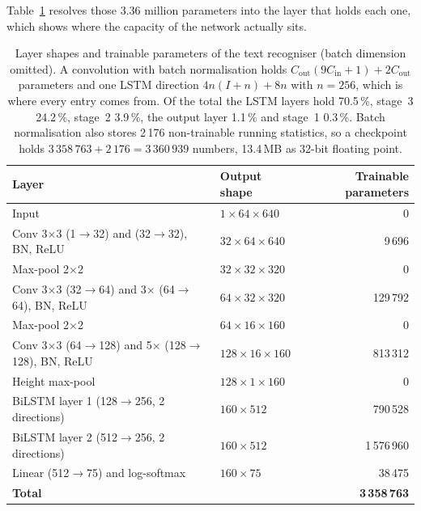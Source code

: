 Table~\ref{tab:rec-layers} resolves those 3.36 million parameters into the layer that holds each one, which shows where the capacity of the network actually sits.

\begin{table}[h]
\centering
\fontsize{8.5}{10.2}\selectfont
\setlength{\tabcolsep}{4pt}
\begin{tabular}{|l|l|r|}
\hline
\textbf{Layer} & \textbf{Output shape} & \textbf{Trainable parameters} \\
\hline
Input & $1\times64\times640$ & 0 \\
Conv 3$\times$3 (1$\to$32) and (32$\to$32), BN, ReLU & $32\times64\times640$ & 9\,696 \\
Max-pool 2$\times$2 & $32\times32\times320$ & 0 \\
Conv 3$\times$3 (32$\to$64) and 3$\times$ (64$\to$64), BN, ReLU & $64\times32\times320$ & 129\,792 \\
Max-pool 2$\times$2 & $64\times16\times160$ & 0 \\
Conv 3$\times$3 (64$\to$128) and 5$\times$ (128$\to$128), BN, ReLU & $128\times16\times160$ & 813\,312 \\
Height max-pool & $128\times1\times160$ & 0 \\
BiLSTM layer 1 (128$\to$256, 2 directions) & $160\times512$ & 790\,528 \\
BiLSTM layer 2 (512$\to$256, 2 directions) & $160\times512$ & 1\,576\,960 \\
Linear (512$\to$75) and log-softmax & $160\times75$ & 38\,475 \\
\hline
\textbf{Total} & & \textbf{3\,358\,763} \\
\hline
\end{tabular}
\caption{Layer shapes and trainable parameters of the text recogniser (batch dimension omitted). A convolution with batch normalisation holds $C_{\mathrm{out}}(9C_{\mathrm{in}}+1)+2C_{\mathrm{out}}$ parameters and one LSTM direction $4n(I+n)+8n$ with $n=256$, which is where every entry comes from. Of the total the LSTM layers hold 70.5\,\%, stage~3 24.2\,\%, stage~2 3.9\,\%, the output layer 1.1\,\% and stage~1 0.3\,\%. Batch normalisation also stores 2\,176 non-trainable running statistics, so a checkpoint holds $3\,358\,763+2\,176=3\,360\,939$ numbers, 13.4\,MB as 32-bit floating point.}
\label{tab:rec-layers}
\end{table}

